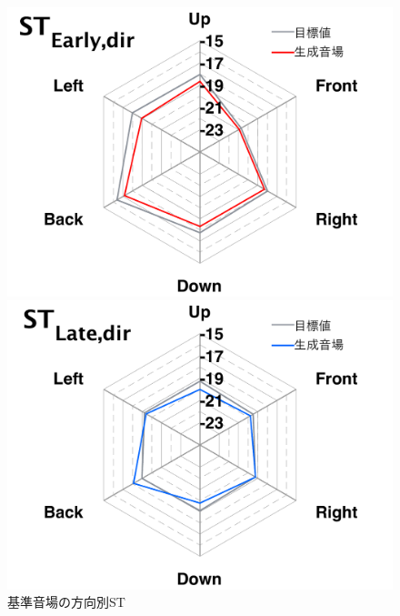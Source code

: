 \documentclass[11pt,a4j]{jreport}
\begin{document}
\begin{figure}[H]
  \begin{minipage}
    [b]{.5\linewidth}
    \centering
    \includegraphics[width=1\linewidth]{images/experimentField/withLegend/00beseOnTargetEarly.pdf}
  \end{minipage}%
  \begin{minipage}
    [b]{.5\linewidth}
    \centering
    \includegraphics[width=1\linewidth]{images/experimentField/withLegend/00baseOnTargetLate.pdf}
    \end{minipage}
  \caption{基準音場の方向別ST}
  \label{fig:基準音場の方向別ST}
\end{figure}
\end{document}
